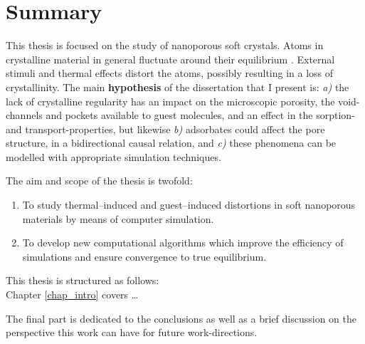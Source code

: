 
{}
\setcounter{footnote}{0}

\chapter*{\textbf{Summary}}
This thesis is focused on the study of nanoporous soft crystals. Atoms in crystalline material in general fluctuate around their equilibrium . External stimuli and thermal effects distort the atoms, possibly resulting in a loss of crystallinity. The main \textbf{hypothesis} of the dissertation that I present is: \emph{a)} the lack of crystalline regularity has an impact on the microscopic porosity, the void-channels and pockets available to guest molecules, and an effect in the sorption- and transport-properties, but likewise \emph{b)} adsorbates could affect the pore structure, in a bidirectional causal relation, and \emph{c)} these phenomena can be modelled with appropriate simulation techniques.


The aim and scope of the thesis is twofold:
\begin{enumerate}
\item To study thermal--induced and guest--induced distortions in soft nanoporous materials by means of computer simulation.
\item To develop new computational algorithms which improve the efficiency of simulations and ensure convergence to true equilibrium.
\end{enumerate}


This thesis is structured as follows:\\

Chapter \ref{chap_intro} covers \ldots

The final part is dedicated to the conclusions as well as a brief discussion on the perspective this work can have for future work-directions.


{}
\setcounter{footnote}{0}

